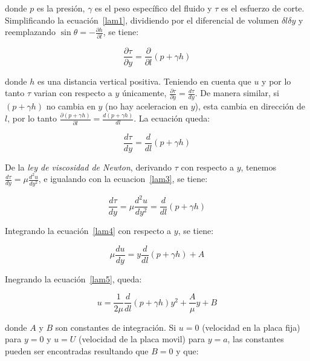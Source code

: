 \documentclass[11pt, oneside]{article}
\begin{document}
donde $p$ es la presi\'on, $\gamma$ es el peso espec\'ifico del fluido y $\tau$ es el esfuerzo de corte. Simplificando la ecuaci\'on~\ref{lam1}, dividiendo por el diferencial de volumen $\delta l \delta y$ y reemplazando $\sin \theta = -\frac{\partial h}{\partial l}$, se tiene:

\begin{equation}
\frac{\partial \tau}{\partial y} = \frac{\partial}{\partial l} (p + \gamma h)
\label{lam2}
\end{equation}

donde $h$ es una distancia vertical positiva. Teniendo en cuenta que $u$ y por lo tanto $\tau$ varian con respecto a $y$ \'unicamente, $\frac{\partial \tau}{\partial y} = \frac{d \tau}{dy}$. De manera similar, si $(p + \gamma h)$ no cambia en $y$ (no hay aceleracion en $y$), esta cambia en direcci\'on de $l$, por lo tanto $\frac{\partial (p + \gamma h)}{\partial l} = \frac{d (p + \gamma h)}{dl}$. La ecuaci\'on queda:

\begin{equation}
\frac{d \tau}{dy} = \frac{d}{dl} (p + \gamma h)
\label{lam3}
\end{equation}

De la \emph{ley de viscosidad de Newton}, derivando $\tau$ con respecto a $y$, tenemos $\frac{d \tau}{dy} = \mu \frac{d^2 u}{dy^2}$, e igualando con la ecuacion~\ref{lam3}, se tiene:

\begin{equation}
\frac{d \tau}{dy} = \mu \frac{d^2 u}{dy^2} = \frac{d}{dl} (p + \gamma h)
\label{lam4}
\end{equation}

Integrando la ecuaci\'on~\ref{lam4} con respecto a $y$, se tiene:

\begin{equation}
\mu \frac{du}{dy} = y\frac{d}{dl} (p + \gamma h) + A 
\label{lam5}
\end{equation}

Inegrando la ecuaci\'on~\ref{lam5}, queda:

\begin{equation}
u = \frac{1}{2\mu} \frac{d}{dl} (p + \gamma h) y^2 + \frac{A}{\mu}y + B 
\label{lam6}
\end{equation}

donde $A$ y $B$ son constantes de integraci\'on. Si $u=0$ (velocidad en la placa fija) para $y=0$ y $u=U$ (velocidad de la placa movil) para $y=a$, las constantes pueden ser encontradas resultando que $B=0$ y que:
\end{document}
